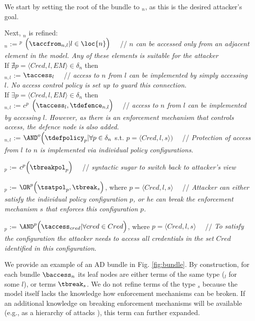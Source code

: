 \documentclass{llncs}
\begin{document}
We start by setting the root of the bundle to \taccess$_n$, as this is the desired attacker's goal. 

Next, \taccess$_n$ is refined:\\
\taccess$_n$ := \OR$^p$ $\Big( \taccfrom_{n,l} | l \in \loc{n}  \Big)$ \ \ // \emph{$n$ can be accessed only from an adjacent element in the model. Any of these elements is suitable for the attacker}\\

If $\nexists p = \langle Cred, l, EM \rangle \in \delta_n$ then\\
 \taccfrom$_{n,l}$ := $ \taccess_{l}$ \ \ // \emph{access to $n$ from $l$ can be implemented by simply accessing $l$. No access control policy is set up to guard this connection.}\\


If $\exists p = \langle Cred, l, EM \rangle \in \delta_n$ then\\
\taccfrom$_{n,l}$ := $c^p$ $\Big( \taccess_{l}, \tdefence_{n,l} \Big)$ \ \ // \emph{access to $n$ from $l$ can be implemented by accessing $l$. However, as there is an enforcement mechanism that controls access, the defence node is also added.}\\

\tdefence$_{n,l}$ := $\AND^o \Big( \tdefpolicy_p | \forall p \in \delta_n$ s.t. $ p = \langle Cred, l, s \rangle \Big)$ \ \ // \emph{Protection of access from $l$ to $n$ is implemented via individual policy configurations.}


\tdefpolicy$_p$ := $c^p \Big( \tbreakpol_p \Big)$ \ \ // \emph{syntactic sugar to switch back to attacker's view} 

\tbreakpol$_p$ := $\OR^p \Big( \tsatpol_p, \tbreak_{s} \Big)$, where $p = \langle Cred, l, s \rangle$ \ \ // \emph{Attacker can either satisfy the individual policy configuration $p$, or he can break the enforcement mechanism $s$ that enforces this configuration $p$. }

\tsatpol$_p$ := $\AND^p \Big( \taccess_{cred} | \forall cred \in Cred \Big)$, where $p = \langle Cred, l, s \rangle$ \ \ // \emph{To satisfy the configuration the attacker needs to access all credentials in the set $Cred$ identified in this configuration}.

We provide an example of an AD bundle in Fig. \ref{fig:bundle}.
By construction, for each bundle $\baccess_n$ its leaf nodes are either terms of the same type (\taccess$_l$ for some $l$), or terms $\tbreak_s$. We do not refine terms of the type \tbreak$_{s}$ because the model itself lacks the knowledge how enforcement mechanisms can be broken. If an additional knowledge on breaking enforcement mechanisms will be available (e.g., as a hierarchy of attacks \cite{Pinchinat-WFMDS-2014}), this term can further expanded. 
\end{document}

